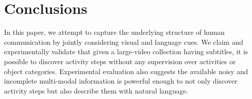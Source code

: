 \section{Conclusions}
\vspace{-2mm}
In this paper, we attempt to capture the underlying structure of human communication by jointly considering visual and language cues. We claim and experimentally validate that given a large-video collection having subtitles, it is possible to discover activity steps without any supervision over activities or object categories. Experimental evaluation also suggests the available noisy and incomplete multi-modal information is powerful enough to not only discover activity steps but also describe them with natural language.
\vspace{-2mm}
